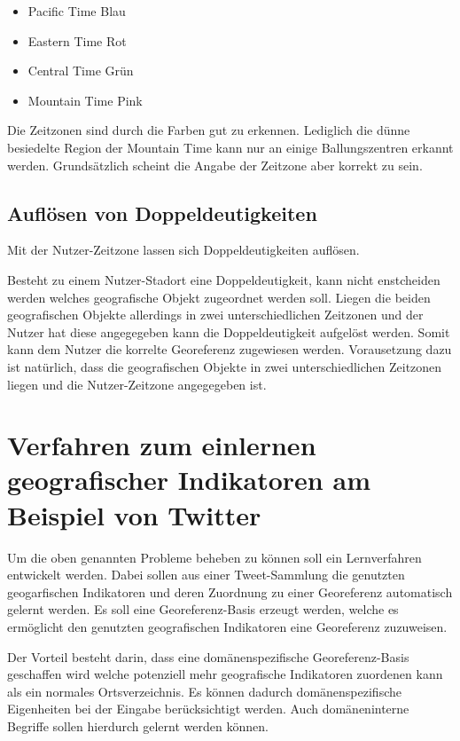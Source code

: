 			\begin{itemize}
			 	\item Pacific Time Blau
			 	\item Eastern Time	Rot
			 	\item Central Time Grün
			 	\item Mountain Time Pink 
			 \end{itemize} 

			 Die Zeitzonen sind durch die Farben gut zu erkennen. 
			 Lediglich die dünne besiedelte Region der Mountain Time kann nur an einige Ballungszentren erkannt werden. 
			 Grundsätzlich scheint die Angabe der Zeitzone aber korrekt zu sein.



		\subsection{Auflösen von Doppeldeutigkeiten}

			Mit der Nutzer-Zeitzone lassen sich Doppeldeutigkeiten auflösen. 

			Besteht zu einem Nutzer-Stadort eine Doppeldeutigkeit, kann nicht enstcheiden werden welches geografische Objekt zugeordnet werden soll.
			Liegen die beiden geografischen Objekte allerdings in zwei unterschiedlichen Zeitzonen und der Nutzer hat diese angegegeben kann die Doppeldeutigkeit aufgelöst werden.
			Somit kann dem Nutzer die korrelte Georeferenz zugewiesen werden.
			Vorausetzung dazu ist natürlich, dass die geografischen Objekte in zwei unterschiedlichen Zeitzonen liegen und die Nutzer-Zeitzone angegegeben ist.

	\section{Verfahren zum einlernen geografischer Indikatoren am Beispiel von Twitter} 

		Um die oben genannten Probleme beheben zu können soll ein Lernverfahren entwickelt werden.
		Dabei sollen aus einer Tweet-Sammlung die genutzten geogarfischen Indikatoren und deren Zuordnung zu einer Georeferenz automatisch gelernt werden.
		Es soll eine Georeferenz-Basis erzeugt werden, welche es ermöglicht den genutzten geografischen Indikatoren eine Georeferenz zuzuweisen. 

		Der Vorteil besteht darin, dass eine domänenspezifische Georeferenz-Basis geschaffen wird welche potenziell mehr geografische Indikatoren zuordenen kann als ein normales Ortsverzeichnis.
		Es können dadurch domänenspezifische Eigenheiten bei der Eingabe berücksichtigt werden. 
		Auch domäneninterne Begriffe sollen hierdurch gelernt werden können. 


